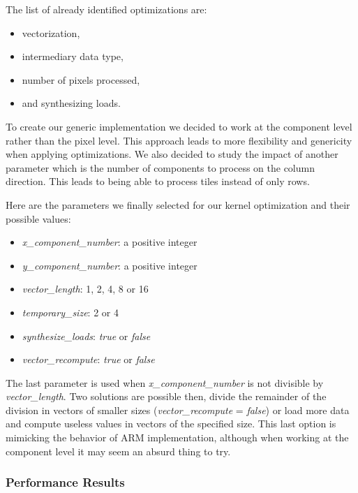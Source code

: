\documentclass[11pt, a4paper, twoside]{montblanc}
\begin{document}
The list of already identified optimizations are:
\begin{itemize}
\item vectorization,
\item intermediary data type,
\item number of pixels processed,
\item and synthesizing loads.
\end{itemize}
To create our generic implementation we decided to work at the component level
rather than the pixel level. This approach leads to more flexibility and
genericity when applying optimizations. We also decided to study the impact of
another parameter which is the number of components to process on the column
direction. This leads to being able to process tiles instead of only rows.

Here are the parameters we finally selected for our kernel optimization and
their possible values:
\begin{itemize}
\item \textit{x\_component\_number}: a positive integer
\item \textit{y\_component\_number}: a positive integer
\item \textit{vector\_length}: 1, 2, 4, 8 or 16
\item \textit{temporary\_size}: 2 or 4
\item \textit{synthesize\_loads}: \textit{true} or \textit{false}
\item \textit{vector\_recompute}: \textit{true} or \textit{false}
\end{itemize}
The last parameter is used when \textit{x\_component\_number} is not divisible by
\textit{vector\_length}. Two solutions are possible then, divide the remainder
of the division in vectors of smaller sizes (\textit{vector\_recompute} =
\textit{false}) or load more data and compute useless values in vectors of the
specified size. This last option is mimicking the behavior of ARM
implementation, although when working at the component level it may seem an
absurd thing to try.

    \subsubsection{Performance Results}
\end{document}
